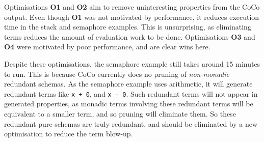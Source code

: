 Optimisations \textbf{O1} and \textbf{O2} aim to remove uninteresting
properties from the CoCo output.  Even though \textbf{O1} was not
motivated by performance, it reduces execution time in the stack and
semaphore examples.  This is unsurprising, as eliminating terms
reduces the amount of evaluation work to be done.  Optimisations
\textbf{O3} and \textbf{O4} were motivated by poor performance, and
are clear wins here.

Despite these optimisations, the semaphore example still takes around
15 minutes to run.  This is because CoCo currently does no pruning of
\emph{non-monadic} redundant schemas.  As the semaphore example uses
arithmetic, it will generate redundant terms like \verb|x + 0|, and
\verb|x - 0|.  Such redundant terms will not appear in generated
properties, as monadic terms involving these redundant terms will be
equivalent to a smaller term, and so pruning will eliminate them.  So
these redundant pure schemas are truly redundant, and should be
eliminated by a new optimisation to reduce the term blow-up.

